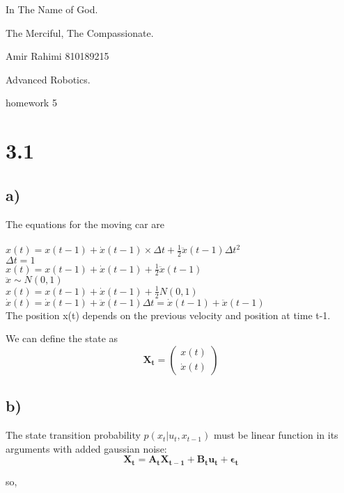 \documentclass[a4paper,12pt]{report}
\begin{document}
\begin{center}
In The Name of God.

The Merciful, The Compassionate.

Amir Rahimi 810189215

Advanced Robotics.

homework 5
\end{center}

\section*{3.1}
\subsection*{a)}
The equations for the moving car are\\
\\
$x(t) = x(t-1) + \dot{x}(t-1) \times \Delta{t} + \frac{1}{2} \ddot{x}(t-1) \Delta{t}^2$\\
$\Delta{t} = 1$\\
$x(t) = x(t-1) + \dot{x}(t-1) + \frac{1}{2} \ddot{x}(t-1)$\\
$\ddot{x} \sim N(0,1)$\\
$x(t) = x(t-1) + \dot{x}(t-1) + \frac{1}{2} N(0,1)$\\
$\dot{x}(t) = \dot{x}(t-1) + \ddot{x}(t-1) \Delta{t} = \dot{x}(t-1) + \ddot{x}(t-1)$\\

The position x(t) depends on the previous velocity and position at time t-1.

We can define the state as
\begin{equation*}
	\mathbf{X_t} = \left(
		\begin{array}{c}
		x(t) \\
		\dot{x}(t)
		\end{array} \right)
\end{equation*}

\subsection*{b)}

The state transition probability $p(x_{t} | u_{t}, x_{t-1})$ must be linear function in its arguments with added gaussian noise:
\begin{equation*}
	\mathbf{X_{t} = A_{t} X_{t-1} + B_{t} u_{t} + \epsilon_{t} } 
\end{equation*}

so,
\end{document}
